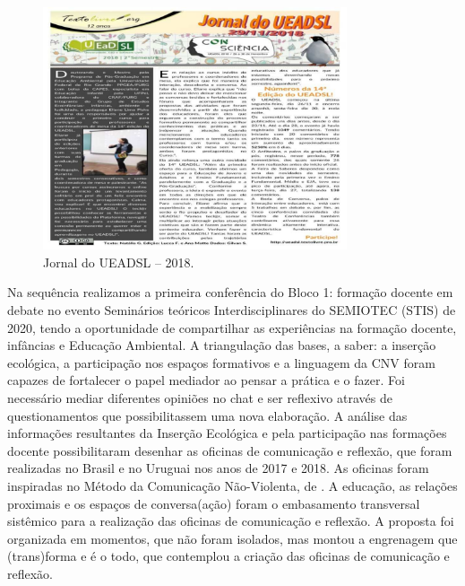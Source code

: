 \documentclass{textolivre}
\begin{document}
\begin{figure}[h!]
 \centering
 \includegraphics[width=0.8\textwidth]{figure02.pdf}
 \caption{Jornal do UEADSL -- 2018.}
 \label{fig-fig02}
\end{figure}

Na sequência realizamos a primeira conferência do Bloco 1: formação docente em debate no evento Seminários teóricos Interdisciplinares do SEMIOTEC (STIS) de 2020, tendo a oportunidade de compartilhar as experiências na formação docente, infâncias e Educação Ambiental. A triangulação das bases, a saber: a inserção ecológica, a participação nos espaços formativos e a linguagem da CNV foram capazes de fortalecer o papel mediador ao pensar a prática e o fazer. Foi necessário mediar diferentes opiniões no chat e ser reflexivo através de questionamentos que possibilitassem uma nova elaboração. A análise das informações resultantes da Inserção Ecológica e pela participação nas formações docente possibilitaram desenhar as oficinas de comunicação e reflexão, que foram realizadas no Brasil e no Uruguai nos anos de 2017 e 2018. As oficinas foram inspiradas no Método da Comunicação Não-Violenta, de \textcite{rosenberg2006}. A educação, as relações proximais e os espaços de conversa(ação) foram o embasamento transversal sistêmico para a realização das oficinas de comunicação e reflexão. A proposta foi organizada em momentos, que não foram isolados, mas montou a engrenagem que (trans)forma e é o todo, que contemplou a criação das oficinas de comunicação e reflexão.
\end{document}
